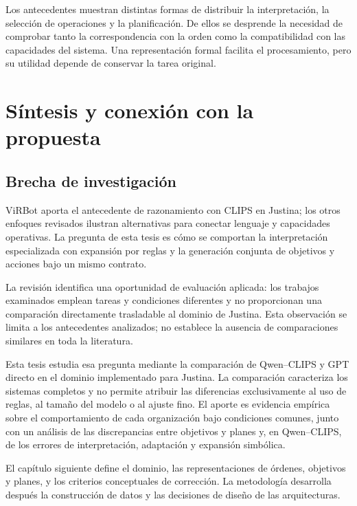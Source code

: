 Los antecedentes muestran distintas formas de distribuir la interpretación, la selección de operaciones y la planificación. De ellos se desprende la necesidad de comprobar tanto la correspondencia con la orden como la compatibilidad con las capacidades del sistema. Una representación formal facilita el procesamiento, pero su utilidad depende de conservar la tarea original.

\section{Síntesis y conexión con la propuesta}

\subsection{Brecha de investigación}
\label{subsec:brecha_investigacion}

ViRBot aporta el antecedente de razonamiento con CLIPS en Justina; los otros enfoques revisados ilustran alternativas para conectar lenguaje y capacidades operativas. La pregunta de esta tesis es cómo se comportan la interpretación especializada con expansión por reglas y la generación conjunta de objetivos y acciones bajo un mismo contrato.

La revisión identifica una oportunidad de evaluación aplicada: los trabajos examinados emplean tareas y condiciones diferentes y no proporcionan una comparación directamente trasladable al dominio de Justina. Esta observación se limita a los antecedentes analizados; no establece la ausencia de comparaciones similares en toda la literatura.

Esta tesis estudia esa pregunta mediante la comparación de Qwen--CLIPS y GPT directo en el dominio implementado para Justina. La comparación caracteriza los sistemas completos y no permite atribuir las diferencias exclusivamente al uso de reglas, al tamaño del modelo o al ajuste fino. El aporte es evidencia empírica sobre el comportamiento de cada organización bajo condiciones comunes, junto con un análisis de las discrepancias entre objetivos y planes y, en Qwen--CLIPS, de los errores de interpretación, adaptación y expansión simbólica.

El capítulo siguiente define el dominio, las representaciones de órdenes, objetivos y planes, y los criterios conceptuales de corrección. La metodología desarrolla después la construcción de datos y las decisiones de diseño de las arquitecturas.
